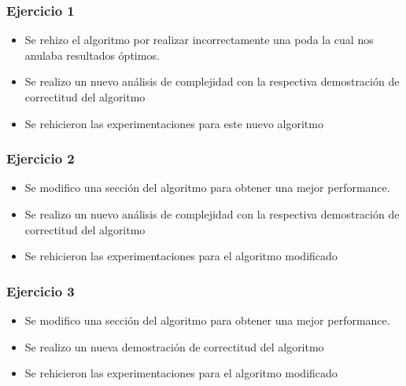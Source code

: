\subsubsection*{Ejercicio 1}

\begin{itemize}
\item Se rehizo el algoritmo por realizar incorrectamente una poda la cual nos anulaba resultados \'optimos.
\item Se realizo un nuevo an\'alisis de complejidad con la respectiva demostraci\'on de correctitud del algoritmo
\item Se rehicieron las experimentaciones para este nuevo algoritmo
\end{itemize}

\subsubsection*{Ejercicio 2}

\begin{itemize}
\item Se modifico una secci\'on del algoritmo para obtener una mejor performance.
\item Se realizo un nuevo an\'alisis de complejidad con la respectiva demostraci\'on de correctitud del algoritmo
\item Se rehicieron las experimentaciones para el algoritmo modificado
\end{itemize}

\subsubsection*{Ejercicio 3}

\begin{itemize}
\item Se modifico una secci\'on del algoritmo para obtener una mejor performance.
\item Se realizo un nueva demostraci\'on de correctitud del algoritmo
\item Se rehicieron las experimentaciones para el algoritmo modificado
\end{itemize}